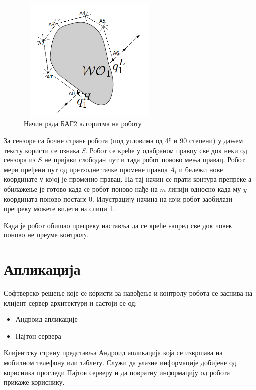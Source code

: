 \documentclass[12pt,oneside]{memoir}
\theoremstyle{remark}
\begin{document}
\begin{figure}[!ht]
\centering
\includegraphics[width=7cm, height=6cm]{slike/adapt_bug.png}
\caption{Начин рада БАГ2 алгоритма на роботу}
\label{fig:bugadapt}
\end{figure}

За сензоре са бочне стране робота (под угловима од 45 и 90 степени) у дањем тексту користи се ознака $S$. Робот се креће у одабраном правцу све док неки од сензора из $S$ не пријави слободан пут и тада робот поново мења правац. Робот мери пређени пут од претходне тачке промене правца $A_{i}$ и бележи нове координате у којој је променио правац. На тај начин се прати контура препреке а обилажење је готово када се робот поново нађе на $m$ линији односно када му $y$ координата поново постане 0. Илустрацију начина на који робот заобилази препреку можете видети на слици  \ref{fig:bugadapt}.

Када је робот обишао препреку наставља да се креће напред све док човек поново не преуме контролу.


\chapter{Апликација}
\label{chp:aplikacija}
Софтверско решење које се користи за навођење и контролу робота се заснива на клијент-сервер архитектури и састоји се од:
\begin{itemize}
\item Андроид апликације
\item Пајтон сервера
\end{itemize}

Клијентску страну представља Андроид апликација која се извршава на мобилном телефону или таблету. Служи да улазне информације добијене од корисника проследи Пајтон серверу и да повратну информацију од робота прикаже кориснику.
\end{document}
